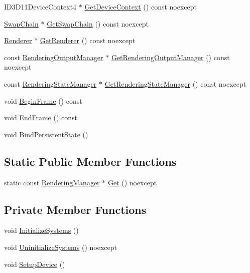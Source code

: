 \begin{DoxyCompactItemize}
\item 
I\+D3\+D11\+Device\+Context4 $\ast$ \hyperlink{classmage_1_1_rendering_manager_a8067ea5d29a3f986dfdbd90ed1b956ee}{Get\+Device\+Context} () const noexcept
\item 
\hyperlink{classmage_1_1_swap_chain}{Swap\+Chain} $\ast$ \hyperlink{classmage_1_1_rendering_manager_a867d9d3986a38c98562cf0cfe9797fe0}{Get\+Swap\+Chain} () const noexcept
\item 
\hyperlink{classmage_1_1_renderer}{Renderer} $\ast$ \hyperlink{classmage_1_1_rendering_manager_a5b357f9f7e241945ac396cd09ba3be7e}{Get\+Renderer} () const noexcept
\item 
const \hyperlink{classmage_1_1_rendering_output_manager}{Rendering\+Output\+Manager} $\ast$ \hyperlink{classmage_1_1_rendering_manager_ad24d51b141e5579a3bd8fc63793977fe}{Get\+Rendering\+Output\+Manager} () const noexcept
\item 
const \hyperlink{classmage_1_1_rendering_state_manager}{Rendering\+State\+Manager} $\ast$ \hyperlink{classmage_1_1_rendering_manager_a762283c6474287a874f8e8667f69a165}{Get\+Rendering\+State\+Manager} () const noexcept
\item 
void \hyperlink{classmage_1_1_rendering_manager_ab1fe907a08658a8cf57217eb5a48728f}{Begin\+Frame} () const
\item 
void \hyperlink{classmage_1_1_rendering_manager_ab4aee54db3d5249e0cc0848383b80dab}{End\+Frame} () const
\item 
void \hyperlink{classmage_1_1_rendering_manager_adadab213b9aabdc6167a012d340084a6}{Bind\+Persistent\+State} ()
\end{DoxyCompactItemize}
\subsection*{Static Public Member Functions}
\begin{DoxyCompactItemize}
\item 
static const \hyperlink{classmage_1_1_rendering_manager}{Rendering\+Manager} $\ast$ \hyperlink{classmage_1_1_rendering_manager_a920fdd741d160b687ecac1d892f8bfd1}{Get} () noexcept
\end{DoxyCompactItemize}
\subsection*{Private Member Functions}
\begin{DoxyCompactItemize}
\item 
void \hyperlink{classmage_1_1_rendering_manager_a80812ecd5c9757b961e46e6bb7533566}{Initialize\+Systems} ()
\item 
void \hyperlink{classmage_1_1_rendering_manager_a3665d58d2a9e8995a348b5f2bd723d8b}{Uninitialize\+Systems} () noexcept
\item 
void \hyperlink{classmage_1_1_rendering_manager_a45d4cadcd572290f352027b5fa86b4f6}{Setup\+Device} ()
\end{DoxyCompactItemize}
